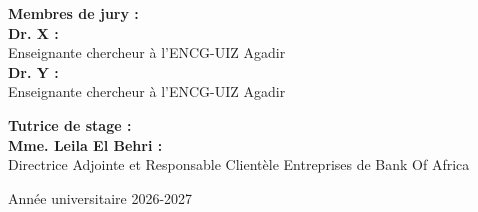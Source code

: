 \vspace{0.5cm}

\noindent
\begin{minipage}[t]{0.45\textwidth}
    \fontsize{12}{14.4}\selectfont
    \textbf{Membres de jury :}\\[0.2cm]
    \textbf{Dr. X :}\\
    Enseignante chercheur à l'ENCG-UIZ Agadir\\[0.2cm]
    \textbf{Dr. Y :}\\
    Enseignante chercheur à l'ENCG-UIZ Agadir
\end{minipage}
\hfill
\begin{minipage}[t]{0.48\textwidth}
    \fontsize{12}{14.4}\selectfont
    \textbf{Tutrice de stage :}\\[0.2cm]
    \textbf{Mme. Leila El Behri :} \\Directrice Adjointe et Responsable Clientèle Entreprises de Bank Of Africa
\end{minipage}

\vfill

\begin{center}
    \fontsize{12}{14.4}\selectfont
    Année universitaire 2026-2027
\end{center}